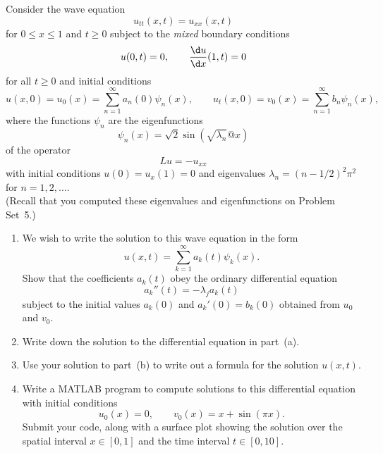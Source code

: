 Consider the wave equation
\[ u_{tt}(x,t) = u_{xx}(x,t) \]
for $0\le x\le 1$ and $t\ge 0$ subject to the \emph{mixed} boundary conditions
\[ u(0,t) = 0, \qquad {\d u\over \d x}(1,t) = 0\]
for all $t\ge 0$ and initial conditions
\[  u(x,0) = u_0(x) = \sum_{n=1}^\infty a_n(0) \psi_n(x), \qquad
    u_t(x,0) = v_0(x) = \sum_{n=1}^\infty b_n \psi_n(x),\]
where the functions $\psi_n$ are the eigenfunctions 
\[ \psi_n(x) = \sqrt{2} \sin(\sqrt{\lambda_n}@x)\]
of the operator
   \[ L u = -u_{xx}\]
with initial conditions $u(0) = u_x(1) = 0$  and 
eigenvalues $\lambda_n = (n-1/2)^2 \pi^2$ for $n=1,2,\ldots.$\\
(Recall that you computed these eigenvalues and eigenfunctions on Problem Set~5.)



\begin{enumerate}
\item We wish to write the solution to this wave equation in the form
         \[ u(x,t) = \sum_{k=1}^\infty a_k(t) \psi_k(x).\]
      Show that the coefficients $a_k(t)$ obey the ordinary differential equation 
       \[ a_k''(t) = -\lambda_j a_k(t) \]
      subject to the initial values $a_k(0)$ and $a_k'(0) = b_k(0)$
      obtained from $u_0$ and $v_0$.

\item Write down the solution to the differential equation in part~(a).

\item Use your solution to part~(b) to write out a formula for the solution $u(x,t)$.

\item Write a MATLAB program to compute solutions to this differential equation 
      with initial conditions
        \[ u_0(x) = 0, \qquad v_0(x) = x+\sin(\pi x).\]
      Submit your code, along with a surface plot showing the solution over 
      the spatial interval $x\in[0,1]$ and the time interval $t\in [0,10]$.
\end{enumerate}


